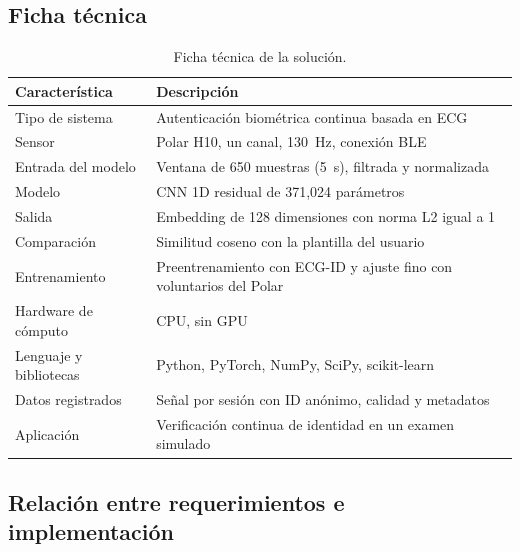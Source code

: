 \subsection{Ficha técnica}

\begin{table}[htbp]
\centering
\caption{Ficha técnica de la solución.}
\label{tab:ficha}
\small
\begin{tabularx}{\textwidth}{l X}
\toprule
\textbf{Característica} & \textbf{Descripción} \\
\midrule
Tipo de sistema & Autenticación biométrica continua basada en ECG \\
Sensor & Polar H10, un canal, 130~Hz, conexión BLE \\
Entrada del modelo & Ventana de 650 muestras (5~s), filtrada y normalizada \\
Modelo & CNN 1D residual de 371{,}024 parámetros \\
Salida & Embedding de 128 dimensiones con norma L2 igual a 1 \\
Comparación & Similitud coseno con la plantilla del usuario \\
Entrenamiento & Preentrenamiento con ECG-ID y ajuste fino con voluntarios del Polar \\
Hardware de cómputo & CPU, sin GPU \\
Lenguaje y bibliotecas & Python, PyTorch, NumPy, SciPy, scikit-learn \\
Datos registrados & Señal por sesión con ID anónimo, calidad y metadatos \\
Aplicación & Verificación continua de identidad en un examen simulado \\
\bottomrule
\end{tabularx}
\end{table}

\subsection{Relación entre requerimientos e implementación}

